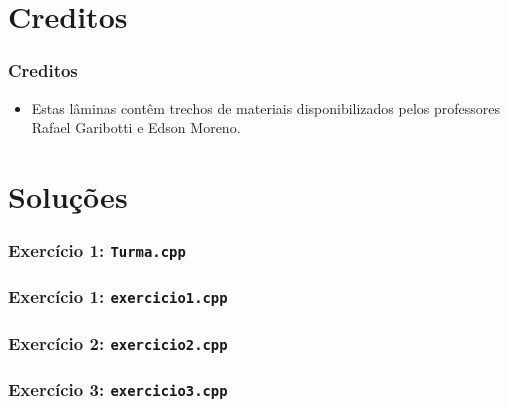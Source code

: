 \documentclass[xcolor={dvipsnames,table},aspectratio=169]{beamer}
\begin{document}
\section{Creditos}

\begin{frame}\frametitle{Creditos}
\begin{itemize}
	\item Estas lâminas contêm trechos de materiais disponibilizados pelos professores Rafael Garibotti e Edson Moreno.
\end{itemize}
\end{frame}

\section{Soluções}

\begin{frame}[fragile]\frametitle{Exercício 1: \texttt{Turma.cpp}}

\end{frame}

\begin{frame}[fragile]\frametitle{Exercício 1: \texttt{exercicio1.cpp}}
\fontsize{3pt}{5pt}\selectfont{

}
\end{frame}

\begin{frame}[fragile]\frametitle{Exercício 2: \texttt{exercicio2.cpp}}
\fontsize{3pt}{5pt}\selectfont{

}
\end{frame}

\begin{frame}[fragile]\frametitle{Exercício 3: \texttt{exercicio3.cpp}}

\end{frame}

\end{document}
